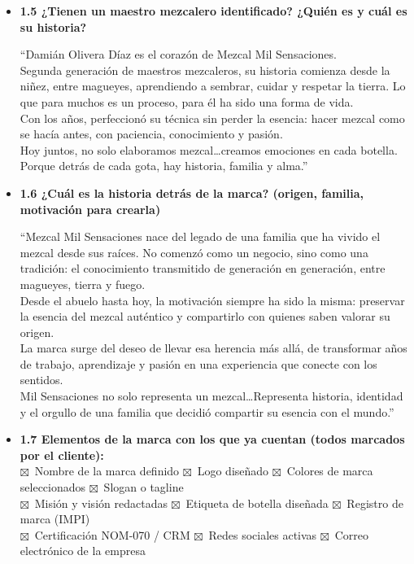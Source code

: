\documentclass[11pt,letterpaper]{article}
\newcommand{\chk}{\textcolor{mezcalAgave}{$\boxtimes$}}
\begin{document}
\begin{itemize}[leftmargin=1.5em]
    \item \textbf{1.5 ¿Tienen un maestro mezcalero identificado? ¿Quién es y cuál es su historia?}
    \begin{answerbox}
    ``Damián Olivera Díaz es el corazón de Mezcal Mil Sensaciones.\\
    Segunda generación de maestros mezcaleros, su historia comienza desde la niñez, entre magueyes, aprendiendo a sembrar, cuidar y respetar la tierra. Lo que para muchos es un proceso, para él ha sido una forma de vida.\\
    Con los años, perfeccionó su técnica sin perder la esencia: hacer mezcal como se hacía antes, con paciencia, conocimiento y pasión.\\
    Hoy juntos, no solo elaboramos mezcal\dots creamos emociones en cada botella.\\
    Porque detrás de cada gota, hay historia, familia y alma.''
    \end{answerbox}

    \item \textbf{1.6 ¿Cuál es la historia detrás de la marca? (origen, familia, motivación para crearla)}
    \begin{answerbox}
    ``Mezcal Mil Sensaciones nace del legado de una familia que ha vivido el mezcal desde sus raíces. No comenzó como un negocio, sino como una tradición: el conocimiento transmitido de generación en generación, entre magueyes, tierra y fuego.\\
    Desde el abuelo hasta hoy, la motivación siempre ha sido la misma: preservar la esencia del mezcal auténtico y compartirlo con quienes saben valorar su origen.\\
    La marca surge del deseo de llevar esa herencia más allá, de transformar años de trabajo, aprendizaje y pasión en una experiencia que conecte con los sentidos.\\
    Mil Sensaciones no solo representa un mezcal\dots Representa historia, identidad y el orgullo de una familia que decidió compartir su esencia con el mundo.''
    \end{answerbox}

    \item \textbf{1.7 Elementos de la marca con los que ya cuentan (todos marcados por el cliente):}\\
    \chk\ Nombre de la marca definido \quad
    \chk\ Logo diseñado \quad
    \chk\ Colores de marca seleccionados \quad
    \chk\ Slogan o tagline \\
    \chk\ Misión y visión redactadas \quad
    \chk\ Etiqueta de botella diseñada \quad
    \chk\ Registro de marca (IMPI) \\
    \chk\ Certificación NOM-070 / CRM \quad
    \chk\ Redes sociales activas \quad
    \chk\ Correo electrónico de la empresa


\end{itemize}
\end{document}
